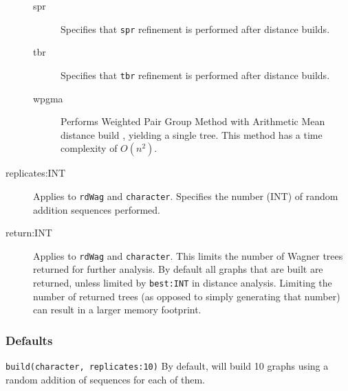 \begin{description}
\begin{description}
			\item[spr] Specifies that \texttt{spr} refinement \citep{Dayhoff1969} is performed 
			after distance builds.

			\item[tbr] Specifies that \texttt{tbr} refinement \citep{Farris1988, swofford1990a} 
			is performed after distance builds.
		
			\item[wpgma] Performs Weighted Pair Group Method with Arithmetic Mean 
			distance build \citep{SokalandMichener1958}, yielding a single tree. This method 
			has a time complexity of $O(n^2)$.
		\end{description}

		\item [replicates:INT] Applies to \texttt{rdWag} and \texttt{character}. Specifies the 
		number (INT) of random addition sequences performed.
		
		\item[return:INT] Applies to \texttt{rdWag} and \texttt{character}. This limits the 
			number of Wagner trees returned for further analysis. By default all graphs that 
			are built are returned, unless limited by \texttt{best:INT} in distance analysis. 
			Limiting the number of returned trees (as opposed to simply generating that number) 
			can result in a larger memory footprint.
	\end{description}		

	\subsubsection{Defaults}
		\texttt{build(character, replicates:10)} By default, \phyg will build 10 graphs using a random
		addition of sequences for each of them.
		

